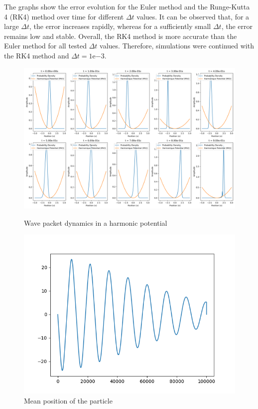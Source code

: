 \documentclass[12pt,french]{article}
\begin{document}
The graphs show the error evolution for the Euler method and the Runge-Kutta 4 (RK4) method over time for different \(\Delta t\) values. It can be observed that, for a large \(\Delta t\), the error increases rapidly, whereas for a sufficiently small \(\Delta t\), the error remains low and stable. Overall, the RK4 method is more accurate than the Euler method for all tested \(\Delta t\) values. Therefore, simulations were continued with the RK4 method and \(\Delta t = 1\mathrm{e}{-3}\).

\begin{figure}[h!]
\centering
\begin{minipage}[b]{0.45\linewidth}
\centering
\includegraphics[width=\linewidth]{Partie_II/Dynamique_Paquet_Onde_Potentiel_Harmonique.png}
\caption{Wave packet dynamics in a harmonic potential}
\label{fig:harmonic-dynamics}
\end{minipage}
\hfill
\begin{minipage}[b]{0.45\linewidth}
\centering
\includegraphics[width=\linewidth]{Partie_II/Position_Moyenne_Paquet_Onde_Potentiel_Harmonique.png}
\caption{Mean position of the particle}
\label{fig:harmonic-mean-position}
\end{minipage}
\end{figure}
\end{document}
